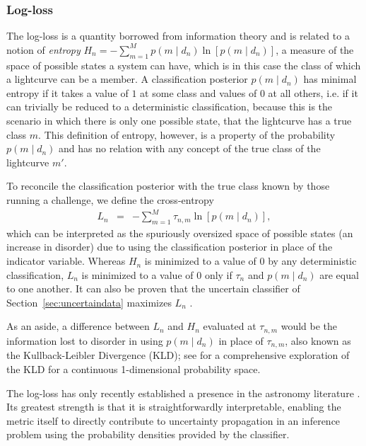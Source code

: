 \subsubsection{Log-loss}
\label{sec:logloss}

The log-loss is a quantity borrowed from information theory and is related to a notion of \textit{entropy} $H_{n} = - \sum_{m=1}^{M} p(m \mid d_{n}) \ln[p(m \mid d_{n})]$, a measure of the space of possible states a system can have, which is in this case the class of which a lightcurve can be a member.
A classification posterior $p(m \mid d_{n})$ has minimal entropy if it takes a value of $1$ at some class and values of $0$ at all others, i.e. if it can trivially be reduced to a deterministic classification, because this is the scenario in which there is only one possible state, that the lightcurve has a true class $m$.
This definition of entropy, however, is a property of the probability $p(m \mid d_{n})$ and has no relation with any concept of the true class of the lightcurve $m'$.

To reconcile the classification posterior with the true class known by those running a challenge, we define the cross-entropy
\begin{eqnarray}
  \label{eq:logloss}
  L_{n} &=& -\sum_{m=1}^{M} \tau_{n, m} \ln[p(m \mid d_{n})],
\end{eqnarray}
which can be interpreted as the spuriously oversized space of possible states (an increase in disorder) due to using the classification posterior in place of the indicator variable.
Whereas $H_{n}$ is minimized to a value of $0$ by any deterministic classification, $L_{n}$ is minimized to a value of $0$ only if $\tau_{n}$ and $p(m \mid d_{n})$ are equal to one another.
It can also be proven that the uncertain classifier of Section~\ref{sec:uncertaindata} maximizes $L_{n}$ \citep{murphy_machine_2012}.

As an aside, a difference between $L_{n}$ and $H_{n}$ evaluated at $\tau_{n, m}$ would be the information lost to disorder in using $p(m \mid d_{n})$ in place of $\tau_{n, m}$, also known as the Kullback-Leibler Divergence (KLD); see \citet{malz_approximating_2018} for a comprehensive exploration of the KLD for a continuous 1-dimensional probability space.

The log-loss has only recently established a presence in the astronomy literature \citep{hon_deep_2017, hon_deep_2018}.
Its greatest strength is that it is straightforwardly interpretable, enabling the metric itself to directly contribute to uncertainty propagation in an inference problem using the probability densities provided by the classifier.

